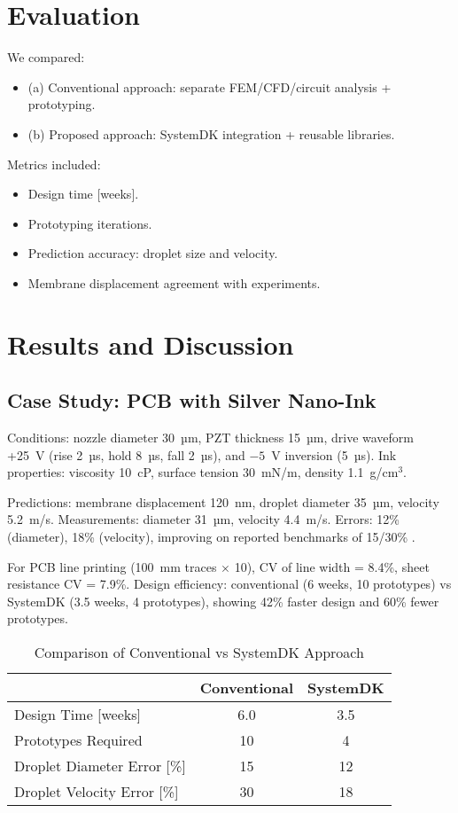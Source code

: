 \documentclass[conference]{IEEEtran}
\begin{document}
\section{Evaluation}
We compared:
\begin{itemize}
  \item (a) Conventional approach: separate FEM/CFD/circuit analysis + prototyping.
  \item (b) Proposed approach: SystemDK integration + reusable libraries.
\end{itemize}

Metrics included:
\begin{itemize}
  \item Design time [weeks].
  \item Prototyping iterations.
  \item Prediction accuracy: droplet size and velocity.
  \item Membrane displacement agreement with experiments.
\end{itemize}

\section{Results and Discussion}
\subsection{Case Study: PCB with Silver Nano-Ink}
Conditions: nozzle diameter 30~µm, PZT thickness 15~µm, drive waveform +25~V (rise 2~µs, hold 8~µs, fall 2~µs), and $-5$~V inversion (5~µs). 
Ink properties: viscosity 10~cP, surface tension 30~mN/m, density 1.1~g/cm$^3$.

Predictions: membrane displacement 120~nm, droplet diameter 35~µm, velocity 5.2~m/s.  
Measurements: diameter 31~µm, velocity 4.4~m/s.  
Errors: 12\% (diameter), 18\% (velocity), improving on reported benchmarks of 15/30\% \cite{boccio2003,lei2012}.

For PCB line printing (100~mm traces $\times$ 10), CV of line width = 8.4\%, sheet resistance CV = 7.9\%.  
Design efficiency: conventional (6 weeks, 10 prototypes) vs SystemDK (3.5 weeks, 4 prototypes), showing 42\% faster design and 60\% fewer prototypes.

\begin{table}[ht]
\centering
\caption{Comparison of Conventional vs SystemDK Approach}
\begin{tabular}{lcc}
\toprule
 & Conventional & SystemDK \\
\midrule
Design Time [weeks] & 6.0 & 3.5 \\
Prototypes Required & 10  & 4   \\
Droplet Diameter Error [\%] & 15 & 12 \\
Droplet Velocity Error [\%] & 30 & 18 \\
\bottomrule
\end{tabular}
\label{tab:comparison}
\end{table}
\end{document}
